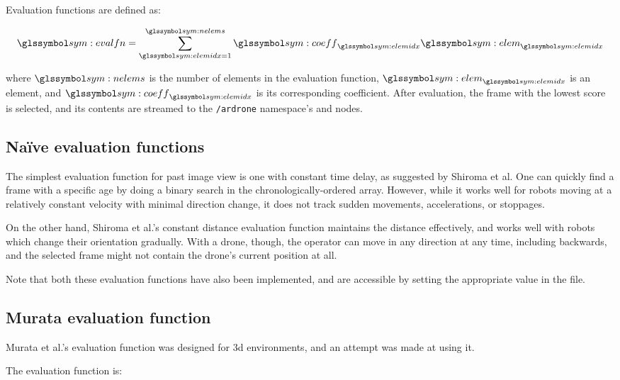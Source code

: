     Evaluation functions are defined as:

    \begin{equation}
      \sym{evalfn} = \sum_{\sym{elemidx}=1}^{\sym{nelems}}{\sym{coeff}_{\sym{elemidx}}\sym{elem}_{\sym{elemidx}}}
    \end{equation}
    
    where $\sym{nelems}$ is the number of elements in the evaluation function, $\sym{elem}_{\sym{elemidx}}$ is an element, and $\sym{coeff}_{\sym{elemidx}}$ is its corresponding coefficient.
    After evaluation, the frame with the lowest score is selected, and its contents are streamed to the \texttt{/ardrone} namespace's \texttt{} and \texttt{} nodes.

    \subsection{Naïve evaluation functions}
      The simplest evaluation function for past image view is one with constant time delay, as suggested by Shiroma et al.\cite{shiroma2004}
      One can quickly find a frame with a specific age by doing a binary search in the chronologically-ordered array.
      However, while it works well for robots moving at a relatively constant velocity with minimal direction change, it does not track sudden movements, accelerations, or stoppages.

      On the other hand, Shiroma et al.'s constant distance evaluation function\cite{shiroma2004} maintains the distance effectively, and works well with robots which change their orientation gradually.
      With a drone, though, the operator can move in any direction at any time, including backwards, and the selected frame might not contain the drone's current position at all.

      Note that both these evaluation functions have also been implemented, and are accessible by setting the appropriate value in the \texttt{} file.

    \subsection{Murata evaluation function}
      Murata et al.'s evaluation function was designed for \gls{3d} environments,\cite{murata2014} and an attempt was made at using it.

      The evaluation function is:

